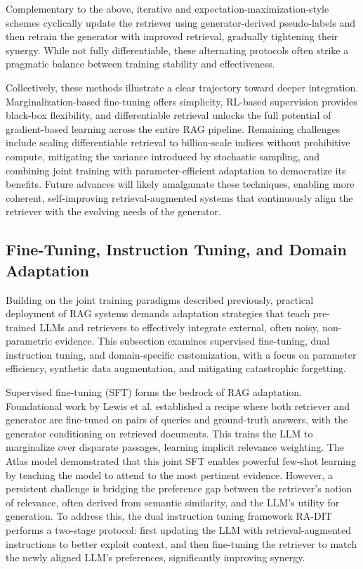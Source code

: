 \documentclass[11pt,a4paper]{article}
\begin{document}
Complementary to the above, iterative and expectation-maximization-style schemes cyclically update the retriever using generator-derived pseudo-labels and then retrain the generator with improved retrieval, gradually tightening their synergy. While not fully differentiable, these alternating protocols often strike a pragmatic balance between training stability and effectiveness.

Collectively, these methods illustrate a clear trajectory toward deeper integration. Marginalization-based fine-tuning offers simplicity, RL-based supervision provides black-box flexibility, and differentiable retrieval unlocks the full potential of gradient-based learning across the entire RAG pipeline. Remaining challenges include scaling differentiable retrieval to billion-scale indices without prohibitive compute, mitigating the variance introduced by stochastic sampling, and combining joint training with parameter-efficient adaptation to democratize its benefits. Future advances will likely amalgamate these techniques, enabling more coherent, self-improving retrieval-augmented systems that continuously align the retriever with the evolving needs of the generator.


\subsection{Fine-Tuning, Instruction Tuning, and Domain Adaptation}


Building on the joint training paradigms described previously, practical deployment of RAG systems demands adaptation strategies that teach pre-trained LLMs and retrievers to effectively integrate external, often noisy, non-parametric evidence. This subsection examines supervised fine-tuning, dual instruction tuning, and domain-specific customization, with a focus on parameter efficiency, synthetic data augmentation, and mitigating catastrophic forgetting.

Supervised fine-tuning (SFT) forms the bedrock of RAG adaptation. Foundational work by Lewis et al. \cite{arxiv:2005.11401v4} established a recipe where both retriever and generator are fine-tuned on pairs of queries and ground-truth answers, with the generator conditioning on retrieved documents. This trains the LLM to marginalize over disparate passages, learning implicit relevance weighting. The Atlas model \cite{arxiv:2208.03299v3} demonstrated that this joint SFT enables powerful few-shot learning by teaching the model to attend to the most pertinent evidence. However, a persistent challenge is bridging the preference gap between the retriever's notion of relevance, often derived from semantic similarity, and the LLM's utility for generation. To address this, the dual instruction tuning framework RA-DIT performs a two-stage protocol: first updating the LLM with retrieval-augmented instructions to better exploit context, and then fine-tuning the retriever to match the newly aligned LLM's preferences, significantly improving synergy.
\end{document}
